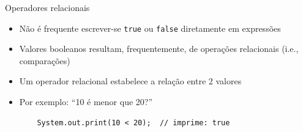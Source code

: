 \documentclass[portuguese, aspectratio=169, xcolor=table]{beamer}
\begin{document}
\begin{frame}[fragile]{Operadores relacionais}
\begin{itemize}
\item Não é frequente escrever-se \texttt{true} ou \texttt{false} diretamente em expressões
\item Valores booleanos resultam, frequentemente, de operações relacionais (i.e., comparações)
\item Um operador relacional estabelece a relação entre 2 valores
\item Por exemplo: ``10 é menor que 20?''
\begin{verbatim}
    System.out.print(10 < 20);  // imprime: true
\end{verbatim}
\end{itemize}
\end{frame}
\end{document}
